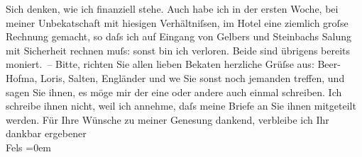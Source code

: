 \begin{ledgroupsized}[t]{13cm}
               Sich denken, wie ich finanziell stehe. Auch habe ich in der ersten Woche, bei meiner
                  Unbeka{\geminationn}tschaft mit hiesigen Verhältniſsen, im Hotel
               eine ziemlich groſse Rechnung gemacht, so daſs ich auf Eingang von Gelbers und Steinbachs Sa{\geminationm}lung mit Sicherheit rechnen muſs:
               sonst bin ich verloren. Beide sind übrigens bereits moniert. –\pend
           \pstart
           Bitte, richten Sie allen lieben Beka{\geminationn}ten herzliche
               Grüſse aus: Beer-Hofma{\geminationn}, Loris, Salten, Engländer und we{\geminationn} Sie sonst noch jemanden treffen, und sagen Sie ihnen,
               es möge mir der eine oder andere auch einmal schreiben. Ich schreibe ihnen nicht,
               weil ich annehme, daſs meine Briefe an Sie ihnen mitgeteilt werden. Für Ihre Wünsche
               zu meiner Genesung dankend, verbleibe ich\pend
           \pstart
           Ihr{\\[\baselineskip]}dankbar ergebener{\\[\baselineskip]}\spacefill\mbox{Fels}\pend
           \leftskip=0em{}
         
         \endnumbering{}\end{ledgroupsized}  \newcommand{\dateiname}{L00181}\newcommand{\titel}{Friedrich M. Fels an Arthur Schnitzler, 23. 2. 1893}\newcommand{\editorInnen}{Martin Anton Müller und Gerd-Hermann Susen}
      